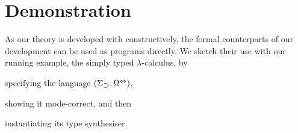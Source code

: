 \documentclass[BiSig.tex]{subfiles}
\begin{document}
\section{Demonstration} \label{sec:formalisation}
As our theory is developed with \Agda constructively, the formal counterparts of our development can be used as programs directly.
We sketch their use with our running example, the simply typed $\lambda$-calculus, by
\begin{inlineenum}
  \item specifying the language $(\Sigma_{\mathbin{\bm{\supset}}}, \Omega^{\Leftrightarrow})$,
  \item showing it mode-correct, and then
  \item instantiating its type synthesiser.
\end{inlineenum}
\end{document}
